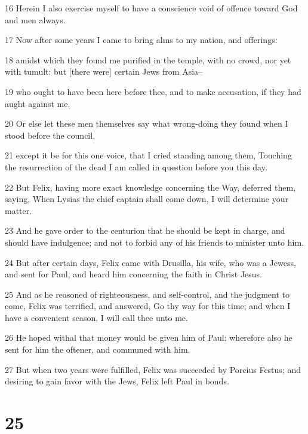 \par 16 Herein I also exercise myself to have a conscience void of offence toward God and men always.
\par 17 Now after some years I came to bring alms to my nation, and offerings:
\par 18 amidst which they found me purified in the temple, with no crowd, nor yet with tumult: but [there were] certain Jews from Asia--
\par 19 who ought to have been here before thee, and to make accusation, if they had aught against me.
\par 20 Or else let these men themselves say what wrong-doing they found when I stood before the council,
\par 21 except it be for this one voice, that I cried standing among them, Touching the resurrection of the dead I am called in question before you this day.
\par 22 But Felix, having more exact knowledge concerning the Way, deferred them, saying, When Lysias the chief captain shall come down, I will determine your matter.
\par 23 And he gave order to the centurion that he should be kept in charge, and should have indulgence; and not to forbid any of his friends to minister unto him.
\par 24 But after certain days, Felix came with Drusilla, his wife, who was a Jewess, and sent for Paul, and heard him concerning the faith in Christ Jesus.
\par 25 And as he reasoned of righteousness, and self-control, and the judgment to come, Felix was terrified, and answered, Go thy way for this time; and when I have a convenient season, I will call thee unto me.
\par 26 He hoped withal that money would be given him of Paul: wherefore also he sent for him the oftener, and communed with him.
\par 27 But when two years were fulfilled, Felix was succeeded by Porcius Festus; and desiring to gain favor with the Jews, Felix left Paul in bonds.

\chapter{25}

